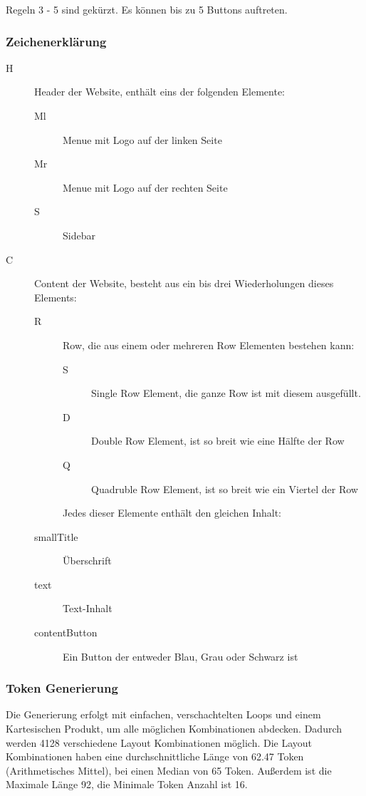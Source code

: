 \documentclass[pdftex,a4paper,halfparskip, article]{scrartcl}
\begin{document}
Regeln 3 - 5 sind gekürzt. Es können bis zu 5 Buttons auftreten.

\subsubsection{Zeichenerklärung}

\begin{description}
	\item[H] Header der Website, enthält eins der folgenden Elemente: 
	\begin{description}
		\item[Ml] Menue mit Logo auf der linken Seite
		\item[Mr] Menue mit Logo auf der rechten Seite
		\item[S] Sidebar	
	\end{description}
	\item[C] Content der Website, besteht aus ein bis drei Wiederholungen dieses Elements:
	\begin{description}
		\item[R] Row, die aus einem oder mehreren Row Elementen bestehen kann:
		\begin{description}
			\item[S] Single Row Element, die ganze Row ist mit diesem ausgefüllt.
			\item[D] Double Row Element, ist so breit wie eine Hälfte der Row
			\item[Q] Quadruble Row Element, ist so breit wie ein Viertel der Row
		\end{description}
		Jedes dieser Elemente enthält den gleichen Inhalt:
		\item[smallTitle] Überschrift
		\item[text] Text-Inhalt
		\item[contentButton] Ein Button der entweder Blau, Grau oder Schwarz ist 
	\end{description}
\end{description}

\subsubsection{Token Generierung}

Die Generierung erfolgt mit einfachen, verschachtelten Loops und einem Kartesischen Produkt, um alle möglichen Kombinationen abdecken. Dadurch werden 4128 verschiedene Layout Kombinationen möglich. 
Die Layout Kombinationen haben eine durchschnittliche Länge von 62.47 Token (Arithmetisches Mittel), bei einen Median von 65 Token. Außerdem ist die Maximale Länge 92, die Minimale Token Anzahl ist 16.
\end{document}
